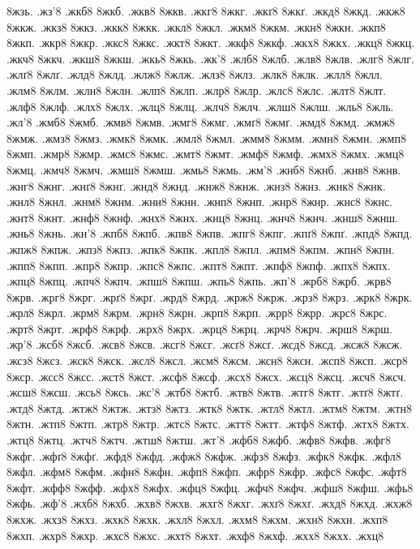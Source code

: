{8жзь.
.жз'8
.жкб8
8жкб.
.жкв8
8жкв.
.жкг8
8жкг.
.жкґ8
8жкґ.
.жкд8
8жкд.
.жкж8
8жкж.
.жкз8
8жкз.
.жкк8
8жкк.
.жкл8
8жкл.
.жкм8
8жкм.
.жкн8
8жкн.
.жкп8
8жкп.
.жкр8
8жкр.
.жкс8
8жкс.
.жкт8
8жкт.
.жкф8
8жкф.
.жкх8
8жкх.
.жкц8
8жкц.
.жкч8
8жкч.
.жкш8
8жкш.
.жкь8
8жкь.
.жк'8
.жлб8
8жлб.
.жлв8
8жлв.
.жлг8
8жлг.
.жлґ8
8жлґ.
.жлд8
8жлд.
.жлж8
8жлж.
.жлз8
8жлз.
.жлк8
8жлк.
.жлл8
8жлл.
.жлм8
8жлм.
.жлн8
8жлн.
.жлп8
8жлп.
.жлр8
8жлр.
.жлс8
8жлс.
.жлт8
8жлт.
.жлф8
8жлф.
.жлх8
8жлх.
.жлц8
8жлц.
.жлч8
8жлч.
.жлш8
8жлш.
.жль8
8жль.
.жл'8
.жмб8
8жмб.
.жмв8
8жмв.
.жмг8
8жмг.
.жмґ8
8жмґ.
.жмд8
8жмд.
.жмж8
8жмж.
.жмз8
8жмз.
.жмк8
8жмк.
.жмл8
8жмл.
.жмм8
8жмм.
.жмн8
8жмн.
.жмп8
8жмп.
.жмр8
8жмр.
.жмс8
8жмс.
.жмт8
8жмт.
.жмф8
8жмф.
.жмх8
8жмх.
.жмц8
8жмц.
.жмч8
8жмч.
.жмш8
8жмш.
.жмь8
8жмь.
.жм'8
.жнб8
8жнб.
.жнв8
8жнв.
.жнг8
8жнг.
.жнґ8
8жнґ.
.жнд8
8жнд.
.жнж8
8жнж.
.жнз8
8жнз.
.жнк8
8жнк.
.жнл8
8жнл.
.жнм8
8жнм.
.жнн8
8жнн.
.жнп8
8жнп.
.жнр8
8жнр.
.жнс8
8жнс.
.жнт8
8жнт.
.жнф8
8жнф.
.жнх8
8жнх.
.жнц8
8жнц.
.жнч8
8жнч.
.жнш8
8жнш.
.жнь8
8жнь.
.жн'8
.жпб8
8жпб.
.жпв8
8жпв.
.жпг8
8жпг.
.жпґ8
8жпґ.
.жпд8
8жпд.
.жпж8
8жпж.
.жпз8
8жпз.
.жпк8
8жпк.
.жпл8
8жпл.
.жпм8
8жпм.
.жпн8
8жпн.
.жпп8
8жпп.
.жпр8
8жпр.
.жпс8
8жпс.
.жпт8
8жпт.
.жпф8
8жпф.
.жпх8
8жпх.
.жпц8
8жпц.
.жпч8
8жпч.
.жпш8
8жпш.
.жпь8
8жпь.
.жп'8
.жрб8
8жрб.
.жрв8
8жрв.
.жрг8
8жрг.
.жрґ8
8жрґ.
.жрд8
8жрд.
.жрж8
8жрж.
.жрз8
8жрз.
.жрк8
8жрк.
.жрл8
8жрл.
.жрм8
8жрм.
.жрн8
8жрн.
.жрп8
8жрп.
.жрр8
8жрр.
.жрс8
8жрс.
.жрт8
8жрт.
.жрф8
8жрф.
.жрх8
8жрх.
.жрц8
8жрц.
.жрч8
8жрч.
.жрш8
8жрш.
.жр'8
.жсб8
8жсб.
.жсв8
8жсв.
.жсг8
8жсг.
.жсґ8
8жсґ.
.жсд8
8жсд.
.жсж8
8жсж.
.жсз8
8жсз.
.жск8
8жск.
.жсл8
8жсл.
.жсм8
8жсм.
.жсн8
8жсн.
.жсп8
8жсп.
.жср8
8жср.
.жсс8
8жсс.
.жст8
8жст.
.жсф8
8жсф.
.жсх8
8жсх.
.жсц8
8жсц.
.жсч8
8жсч.
.жсш8
8жсш.
.жсь8
8жсь.
.жс'8
.жтб8
8жтб.
.жтв8
8жтв.
.жтг8
8жтг.
.жтґ8
8жтґ.
.жтд8
8жтд.
.жтж8
8жтж.
.жтз8
8жтз.
.жтк8
8жтк.
.жтл8
8жтл.
.жтм8
8жтм.
.жтн8
8жтн.
.жтп8
8жтп.
.жтр8
8жтр.
.жтс8
8жтс.
.жтт8
8жтт.
.жтф8
8жтф.
.жтх8
8жтх.
.жтц8
8жтц.
.жтч8
8жтч.
.жтш8
8жтш.
.жт'8
.жфб8
8жфб.
.жфв8
8жфв.
.жфг8
8жфг.
.жфґ8
8жфґ.
.жфд8
8жфд.
.жфж8
8жфж.
.жфз8
8жфз.
.жфк8
8жфк.
.жфл8
8жфл.
.жфм8
8жфм.
.жфн8
8жфн.
.жфп8
8жфп.
.жфр8
8жфр.
.жфс8
8жфс.
.жфт8
8жфт.
.жфф8
8жфф.
.жфх8
8жфх.
.жфц8
8жфц.
.жфч8
8жфч.
.жфш8
8жфш.
.жфь8
8жфь.
.жф'8
.жхб8
8жхб.
.жхв8
8жхв.
.жхг8
8жхг.
.жхґ8
8жхґ.
.жхд8
8жхд.
.жхж8
8жхж.
.жхз8
8жхз.
.жхк8
8жхк.
.жхл8
8жхл.
.жхм8
8жхм.
.жхн8
8жхн.
.жхп8
8жхп.
.жхр8
8жхр.
.жхс8
8жхс.
.жхт8
8жхт.
.жхф8
8жхф.
.жхх8
8жхх.
.жхц8
}
